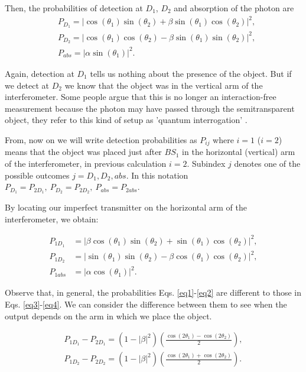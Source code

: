 \documentclass[12pt]{book}
\begin{document}
Then, the probabilities of detection at $D_1$, $D_2$ and absorption of the photon are 
\begin{align}
& P_{D_{1}}=|\cos(\theta_{1})\sin(\theta_{2})+\beta \sin(\theta_{1})\cos(\theta_{2})|^2, \label{eq1}\\
& P_{D_{2}}=|\cos(\theta_{1})\cos(\theta_{2})-\beta \sin(\theta_{1})\sin(\theta_{2})|^2, \\
& P_{abs}=|\alpha \sin(\theta_{1})|^2. \label{eq2}
\end{align}

Again, detection at $D_1$ tells us nothing about the presence of the object. But if we detect at $D_2$ we know that the object was in the vertical arm of the interferometer. Some people argue that this is no longer an interaction-free measurement because the photon may have passed through the semitransparent object, they refer to this kind of setup as 'quantum interrogation' \cite{QI1,QI2}. 


From, now on we will write detection probabilities as $P_{ij}$ where $i=1$ ($i=2$) means that the object was placed just after $BS_1$ in the horizontal (vertical) arm of the interferometer, in previous calculation $i=2$. Subindex $j$ denotes one of the possible outcomes $j=D_{1},D_{2},abs$. In this notation $P_{D_1}= P_{2D_{1}}, ~P_{D_2}= P_{2D_{2}}, ~P_{abs}= P_{2abs} $. 

By locating our imperfect transmitter on the horizontal arm of the interferometer, we obtain:

\begin{align}
P_{1D_{1}}&=|\beta\cos(\theta_{1})\sin(\theta_{2}) +\sin(\theta_{1})\cos(\theta_{2})|^2,\label{eq3} \\
P_{1D_{2}}&=|\sin(\theta_{1})\sin(\theta_{2})-\beta \cos(\theta_{1})\cos(\theta_{2})|^2,\\
P_{1abs}&=|\alpha \cos(\theta_{1})|^2. \label{eq4}
\end{align}



Observe that, in general, the probabilities Eqs. \ref{eq1}-\ref{eq2} are different to those in Eqs. \ref{eq3}-\ref{eq4}. We can consider the difference between them to see when the output depends on the arm in which we place the object.


\begin{align}
P_{1D_{1}}-P_{2D_{1}}=(1-|\beta|^2)\left(\frac{\cos(2 \theta_{1})-\cos(2 \theta_{2})}{2}\right), \\
P_{1D_{2}}-P_{2D_{2}}=(1-|\beta|^2)\left(\frac{\cos(2 \theta_{1})+\cos(2 \theta_{2})}{2}\right).
\end{align}
\end{document}
